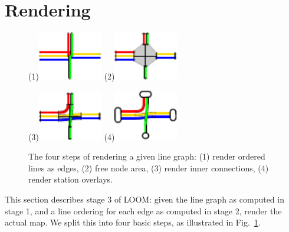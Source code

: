 \documentclass[format=acmsmall, review=false, screen=true]{acmart}
\begin{document}
\section{Rendering}\label{SEC:rendering}
%
\begin{figure}[b]
  \centering
  (1)\includegraphics[width=0.25\textwidth]{render_examples/rendering/render_example1.pdf}
  \hspace{1.5cm}
  (2)\includegraphics[width=0.25\textwidth]{render_examples/rendering/render_example2.pdf}

  \vspace{0.4cm}
  \centering
  (3)\includegraphics[width=0.25\textwidth]{render_examples/rendering/render_example3.pdf}
  \hspace{1.5cm}
  (4)\includegraphics[width=0.25\textwidth]{render_examples/rendering/render_example4.pdf}

	\caption{The four steps of rendering a given line graph: (1) render ordered lines as edges, (2) free node area, (3) render inner connections, (4) render station overlays.}
	\label{FIG:renderingproc}
\end{figure}
This section describes stage 3 of LOOM: given the line graph as computed in stage 1, and a line ordering for each edge as computed in stage 2, render the actual map.
We split this into four basic steps, as illustrated in Fig.~\ref{FIG:renderingproc}.
\end{document}
